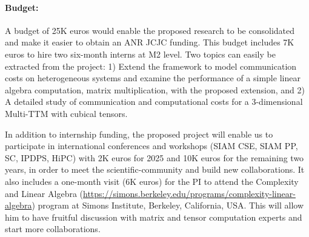 \documentclass[a4paper,11pt]{article}
\newcommand{\sk}[1]{{\color{blue} \emph{#1}}}
\begin{document}
   	\vspace*{-0.325cm}\paragraph{Budget:} A budget of 25K euros would enable the proposed research to be consolidated  and make it easier to obtain an ANR JCJC funding. This budget includes 7K euros to hire two six-month interns at M2 level. Two topics can easily be extracted from the project: 1) Extend the framework to model communication costs on heterogeneous systems and examine the performance of a simple linear algebra computation, matrix multiplication, with the proposed extension, and 2) A detailed study of communication and computational costs for a 3-dimensional Multi-TTM with cubical tensors.
   	
   	
   	In addition to internship funding, the proposed project will enable us to participate in international conferences and workshops (SIAM CSE, SIAM PP, SC, IPDPS, HiPC) with 2K euros for 2025 and 10K euros for the remaining two years, in order to meet the scientific-community and build new collaborations. It also includes a one-month visit (6K euros) for the PI to attend the Complexity and Linear Algebra (\url{https://simons.berkeley.edu/programs/complexity-linear-algebra}) program at Simons Institute, Berkeley, California, USA. This will allow him to have fruitful discussion with matrix and tensor computation experts and start more collaborations.


	
	
	
	\vspace*{-0.415cm}
	{\footnotesize
		
		
	}
\vspace*{-0.215cm}
	

%	
\end{document}
